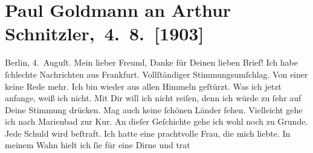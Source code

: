 

         
         \renewcommand{\erwaehntePersonen}{Personen: Paul Goldmann, Theodore Rottenberg, Olga Schnitzler}
         \renewcommand{\erwaehnteOrte}{Orte: Berlin, Frankfurt am Main, Marienbad, Wien}
         \renewcommand{\erwaehnteWerke}{}
               \section[ Paul Goldmann an Arthur Schnitzler, 4. 8. {[}1903{]}]{ Paul Goldmann an Arthur Schnitzler, 4. 8. {[}1903{]}}\nopagebreak{}\rehead{ }\begin{ledgroupsized}[t]{13cm}\normalsize\beginnumbering{} \toendnotes[C]{\smallbreak\pagebreak[2]} 
\toendnotes[C]{\smallbreak}\pstart
           \centering{}{\pb}Berlin, 4. Auguſt.\pend
           \pstart{}Mein lieber Freund,\pend\pstart
           Danke für Deinen lieben Brief!\pend
           \pstart
           Ich habe ſchlechte Nachrichten aus Frankfurt.
               Vollſtändiger Stimmungsumſchlag. Von einer \label{K_L03380-1v}\label{K_L03380-1h} keine Rede mehr.\pend
           \pstart
           Ich bin wieder aus allen Himmeln geſtürzt. Was ich jetzt anfange, weiß ich nicht. Mit
               Dir will ich nicht reiſen, denn ich würde zu ſehr auf Deine Stimmung drücken. Mag
               auch keine ſchönen Länder ſehen. Vielleicht gehe ich nach Marienbad zur Kur.\pend
           \pstart
           An dieſer Geſchichte gehe ich wohl noch zu Grunde. Jede Schuld wird beſtraft. Ich
               hatte eine prachtvolle Frau,
               die {\pb}mich liebte. In meinem Wahn hielt ich ſie für eine Dirne und trat

\end{ledgroupsized}
